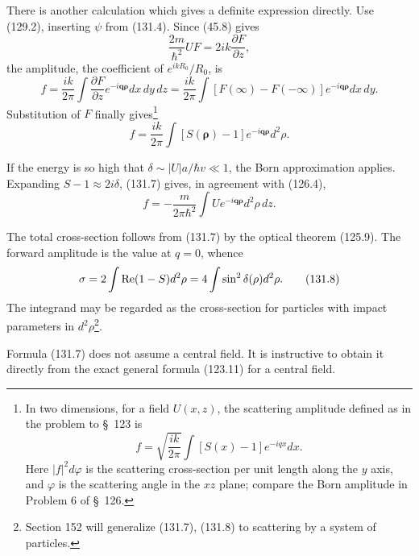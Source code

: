 There is another calculation which gives a definite expression directly. Use
(129.2), inserting $\psi$ from (131.4). Since (45.8) gives
\[
 \frac{2m}{\hbar^2}UF=2ik\frac{\partial F}{\partial z},
\]
the amplitude, the coefficient of $e^{ikR_0}/R_0$, is
\[
 f=\frac{ik}{2\pi}\int\frac{\partial F}{\partial z}
 e^{-i\mathbf{q\rho}}dx\,dy\,dz
 =\frac{ik}{2\pi}\int[F(\infty)-F(-\infty)]
 e^{-i\mathbf{q\rho}}dx\,dy.
\]
Substitution of $F$ finally gives\footnote{In two dimensions, for a field
$U(x,z)$, the scattering amplitude defined as in the problem to \S~123 is
\begin{equation}
 f=\sqrt{\frac{ik}{2\pi}}\int[S(x)-1]e^{-iqx}dx.
 \tag{131.7a}
\end{equation}
Here $|f|^2d\varphi$ is the scattering cross-section per unit length along the
$y$ axis, and $\varphi$ is the scattering angle in the $xz$ plane; compare the
Born amplitude in Problem 6 of \S~126.}
\begin{equation}
 f=\frac{ik}{2\pi}\int[S(\boldsymbol\rho)-1]
 e^{-i\mathbf{q\rho}}d^2\rho.
 \tag{131.7}
\end{equation}

If the energy is so high that $\delta\sim|U|a/\hbar v\ll1$, the Born
approximation applies. Expanding $S-1\approx2i\delta$, (131.7) gives, in
agreement with (126.4),
\[
 f=-\frac{m}{2\pi\hbar^2}\int Ue^{-i\mathbf{q\rho}}d^2\rho\,dz.
\]

The total cross-section follows from (131.7) by the optical theorem (125.9).
The forward amplitude is the value at $q=0$, whence
\begin{equation}
 \sigma=2\int\mathop{\rm Re}(1-S)d^2\rho
 =4\int\sin^2\delta(\rho)d^2\rho.
 \tag{131.8}
\end{equation}
The integrand may be regarded as the cross-section for particles with impact
parameters in $d^2\rho$\footnote{Section 152 will generalize (131.7), (131.8)
to scattering by a system of particles.}.

Formula (131.7) does not assume a central field. It is instructive to obtain it
directly from the exact general formula (123.11) for a central field.

